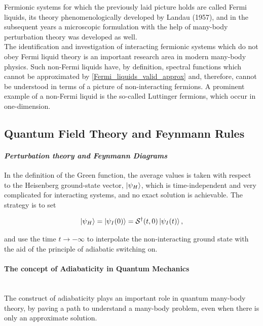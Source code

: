 \documentclass{homework}
\begin{document}
\begin{tcolorbox}[colback=my-blue, 
title = Physical Context]

Fermionic systems for which the previously laid picture holds are called Fermi liquids, its theory phenomenologically developed by Landau (1957), and in the subsequent years a microscopic formulation with the help of many-body perturbation theory was developed as well. \\

The identification and investigation of interacting fermionic systems which do not obey Fermi liquid theory is an important research area in modern many-body physics. Such non-Fermi liquids have, by definition, spectral functions which cannot be approximated by \cref{Fermi_liquids_valid_approx} and, therefore, cannot be understood in terms of a picture of non-interacting fermions. A prominent example of a non-Fermi liquid is the so-called Luttinger fermions, which occur in one-dimension.  
\end{tcolorbox}

\subsection{\textbf{Quantum Field Theory and Feynmann Rules}}

\paragraph{\textit{{Perturbation theory and Feynmann Diagrams}}}

In the definition of the Green function, the average values is taken with respect to the Heisenberg ground-state vector, $\ket{\psi_H}$, which is time-independent and very complicated for interacting systems, and no exact solution is achievable. The strategy is to set 

$$
    \ket{\psi_H} = \ket{\psi_I (0)} = \mathcal{S}^\dagger(t,0) \ket{\psi_I (t)},
$$

and use the time $t \rightarrow -\infty$ to interpolate the non-interacting ground state with the aid of the principle of adiabatic switching on. \\

\paragraph{The concept of Adiabaticity in Quantum Mechanics} \\

The construct of adiabaticity plays an important role in quantum many-body theory, by paving a path to understand a many-body problem, even when there is only an approximate solution. \\
\end{document}
